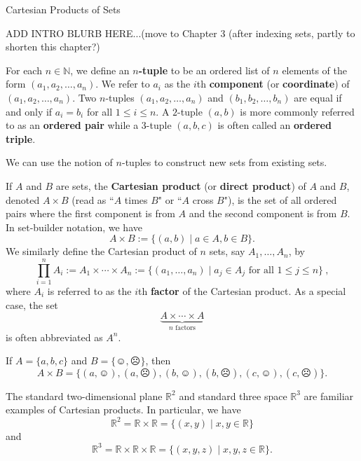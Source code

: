 \begin{section}{Cartesian Products of Sets}\label{sec:Cartesian Products}

ADD INTRO BLURB HERE...(move to Chapter 3 (after indexing sets, partly to shorten this chapter?)

\begin{definition}
For each $n\in \mathbb{N}$, we define an \textbf{$n$-tuple} to be an ordered list of $n$ elements of the form $(a_1, a_2,\ldots,a_n)$. We refer to $a_i$ as the $i$th \textbf{component} (or \textbf{coordinate}) of $(a_1, a_2,\ldots,a_n)$. Two $n$-tuples $(a_1, a_2,\ldots,a_n)$ and $(b_1, b_2,\ldots,b_n)$ are equal if and only if $a_i=b_i$ for all $1\leq i\leq n$. A $2$-tuple $(a,b)$ is more commonly referred to as an \textbf{ordered pair} while a $3$-tuple $(a,b,c)$ is often called an \textbf{ordered triple}.
\end{definition}

We can use the notion of $n$-tuples to construct new sets from existing sets.

\begin{definition}
If $A$ and $B$ are sets, the \textbf{Cartesian product} (or \textbf{direct product}) of $A$ and $B$, denoted $A\times B$ (read as ``$A$ times $B$" or ``$A$ cross $B$"), is the set of all ordered pairs where the first component is from $A$ and the second component is from $B$. In set-builder notation, we have
\[
\boxed{A\times B:=\{(a,b)\mid a\in A, b\in B\}}.
\]
We similarly define the Cartesian product of $n$ sets, say $A_1, \ldots, A_n$, by
\[
\boxed{\prod_{i=1}^{n} A_i:=A_1\times \cdots \times A_n:=\{(a_1,\ldots,a_n)\mid  a_j\in A_j \mbox{ for all }1\leq j\leq n\}}\ ,
\]
where $A_i$ is referred to as the $i$th \textbf{factor} of the Cartesian product. As a special case, the set 
\[
\underbrace{A\times \cdots \times A}_{n\text{ factors}}
\]
is often abbreviated as $A^n$.
\end{definition}

\begin{example}\label{ex:CartesianProduct}
If $A=\{a,b,c\}$ and $B=\{\smiley,\frownie\}$, then 
\[
A\times B=\{(a,\smiley), (a,\frownie),(b,\smiley),(b,\frownie), (c,\smiley),(c,\frownie)\}.
\]
\end{example}

\begin{example}
The standard two-dimensional plane $\mathbb{R}^2$ and standard three space $\mathbb{R}^{3}$ are familiar examples of Cartesian products.  In particular, we have
\[
\mathbb{R}^2=\mathbb{R}\times \mathbb{R}=\{(x,y)\mid x,y\in \mathbb{R}\}
\]
and
\[
\mathbb{R}^3=\mathbb{R}\times \mathbb{R}\times \mathbb{R}=\{(x,y,z)\mid x,y,z\in \mathbb{R}\}.
\]
\end{example}


\end{section}
